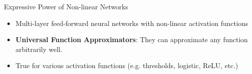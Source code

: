 \documentclass[handout,aspectratio=169]{beamer}
\begin{document}
\begin{frame}{Expressive Power of Non-linear Networks}
  \begin{itemize}
  \setlength\itemsep{1em}
    \item Multi-layer feed-forward neural networks  with non-linear activation functions
    \item \textbf{Universal Function Approximators}:  They can approximate any function arbitrarily well.
    \item True for various activation functions  (e.g. thresholds, logistic, ReLU, etc.)
  \end{itemize}
\end{frame}
\end{document}
